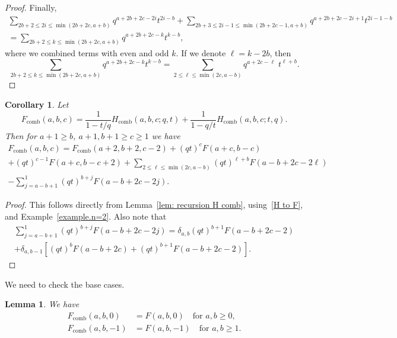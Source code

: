 \documentclass[11pt,reqno]{amsart}
\newcommand{\comb}{\operatorname{comb}}
\newtheorem{lemma}[theorem]{Lemma}
\newtheorem{corollary}[theorem]{Corollary}
\theoremstyle{definition}
\numberwithin{equation}{section}
\begin{document}
\begin{proof}
Finally,
\begin{multline*}
	\sum_{2b+2\leqslant 2i\leqslant \min(2b+2c,a+b)}q^{a+2b+2c-2i}t^{2i-b}
	+\sum_{2b+3\leqslant 2i-1\leqslant \min(2b+2c-1,a+b)}q^{a+2b+2c-2i+1}t^{2i-1-b}\\
	= \sum_{2b+2\leqslant k\leqslant \min(2b+2c,a+b)}q^{a+2b+2c-k}t^{k-b},
\end{multline*}
where we combined terms with even and odd $k$.
If we denote $\ell=k-2b$, then
\[
	\sum_{2b+2\leqslant k\leqslant \min(2b+2c,a+b)}q^{a+2b+2c-k}t^{k-b}=
	\sum_{2\leqslant \ell\leqslant \min(2c,a-b)}q^{a+2c-\ell}\; t^{\ell+b}.
\]
\end{proof}

\begin{corollary}
\label{corollary.Fcomb recursion}
Let 
\[
	F_{\comb}(a,b,c)=\frac{1}{1-t/q}H_{\comb}(a,b,c;q,t)+\frac{1}{1-q/t}H_{\comb}(a,b,c;t,q).
\]
Then for $a+1 \geqslant b$, $a+1,b+1 \geqslant c\geqslant 1$ we have 
\begin{multline}
	F_{\comb}(a,b,c)=F_{\comb}(a+2,b+2,c-2)+(qt)^cF(a+c,b-c)\\+(qt)^{c-1}F(a+c,b-c+2)+
	\sum_{2\leqslant \ell\leqslant \min(2c,a-b)}(qt)^{\ell+b}F(a-b+2c-2\ell)\\
	- \sum_{j=a-b+1}^1 (qt)^{b+j} F(a-b+2c-2j).
\end{multline}
\end{corollary}

\begin{proof}
This follows directly from Lemma~\ref{lem: recursion H comb}, using~\eqref{H to F}, and Example~\ref{example.n=2}.
Also note that
\begin{multline*}
	\sum_{j=a-b+1}^1 (qt)^{b+j} F(a-b+2c-2j) = \delta_{a,b} (qt)^{b+1} F(a-b+2c-2) \\
	+ \delta_{a,b-1} \left[ (qt)^b F(a-b+2c) + (qt)^{b+1} F(a-b+2c-2) \right].
\end{multline*}
\end{proof}

We need to check the base cases.

\begin{lemma}
\label{lemma.initial condition}
We have
\begin{equation*}
\begin{split}
	F_{\comb}(a,b,0)&=F(a,b,0) \quad \text{for $a,b\geqslant 0$,}\\
	F_{\comb}(a,b,-1)&=F(a,b,-1) \quad \text{for $a,b \geqslant 1$.}
\end{split}
\end{equation*}
\end{lemma}
\end{document}
